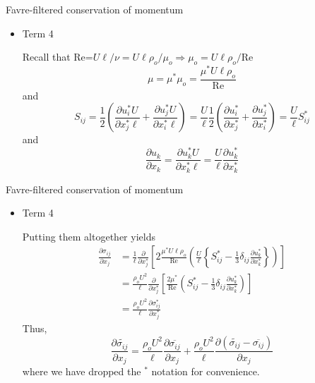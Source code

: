 
\begin{frame}{Favre-filtered conservation of momentum}
\begin{itemize}
\item Term 4

Recall that Re=$U\ell/\nu = U\ell\rho_o/\mu_o\Rightarrow \mu_o=U\ell\rho_o/\text{Re}$
$$\mu = \mu^* \mu_o = \frac{\mu^* U\ell\rho_o}{\text{Re}}$$ 
and
$$S_{ij} = \frac{1}{2}\left(\frac{\partial u_i^* U}{\partial x_j^* \ell} + \frac{\partial u_j^* U}{\partial x_i^* \ell}\right) = \frac{U}{\ell}\frac{1}{2}\left(\frac{\partial u_i^*}{\partial x_j^*} + \frac{\partial u_j^*}{\partial x_i^*}\right) = \frac{U}{\ell}S_{ij}^*$$
and
$$\frac{\partial u_k}{\partial x_k}=\frac{\partial u_k^* U}{\partial x_k^* \ell} = \frac{U}{\ell}\frac{\partial u_k^*}{\partial x_k^*}$$
\end{itemize}
\end{frame}


\begin{frame}{Favre-filtered conservation of momentum}
\begin{itemize}
\item Term 4

Putting them altogether yields
\begin{align*}
\frac{\partial \sigma_{ij}}{\partial x_j} &= \frac{1}{\ell}\frac{\partial}{\partial x_j^*}\left[2\frac{\mu^* U\ell\rho_o}{\text{Re}}\left(\frac{U}{\ell}\left\{S_{ij}^* - \frac{1}{3} \delta_{ij} \frac{\partial u_k^*}{\partial x_k^*}\right\}\right)\right]\\
&= \frac{\rho_o U^2}{\ell} \frac{\partial}{\partial x_j^*}\left[\frac{2\mu^*}{\text{Re}} \left( S_{ij}^* - \frac{1}{3} \delta_{ij} \frac{\partial u_k^*}{\partial x_k^*}\right)\right]\\
&= \frac{\rho_o U^2}{\ell} \frac{\partial \sigma_{ij}^*}{\partial x_j^*}
\end{align*}
Thus,
$$\boxed{\frac{\partial \widetilde{\sigma_{ij}}}{\partial x_j} = \frac{\rho_o U^2}{\ell}\frac{\partial \overline{\sigma_{ij}}}{\partial x_j} + \frac{\rho_o U^2}{\ell}\frac{\partial \left(\widetilde{\sigma_{ij}}- \overline{\sigma_{ij}}\right)}{\partial x_j}}$$
where we have dropped the $^*$ notation for convenience. 
\end{itemize}
\end{frame}


